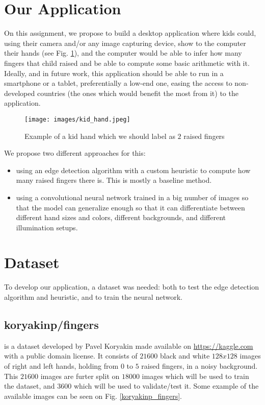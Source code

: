 \documentclass[conference]{IEEEtran}
\begin{document}
\section{Our Application}

On this assignment, we propose to build a desktop application where kids could, using their camera and/or any image capturing device, show to the computer their hands (see Fig. \ref{kid_hand}), and the computer would be able to infer how many fingers that child raised and be able to compute some basic arithmetic with it. Ideally, and in future work, this application should be able to run in a smartphone or a tablet, preferentially a low-end one, easing the access to non-developed countries (the ones which would benefit the most from it) to the application.

\begin{figure}[htbp]
\centerline{\texttt{[image: images/kid\_hand.jpeg]}}
\caption{Example of a kid hand which we should label as $2$ raised fingers}
\label{kid_hand}
\end{figure}

We propose two different approaches for this:

\begin{itemize}
    \item using an edge detection algorithm with a custom heuristic to compute how many raised fingers there is. This is mostly a baseline method.
    \item using a convolutional neural network trained in a big number of images so that the model can generalize enough so that it can differentiate between different hand sizes and colors, different backgrounds, and different illumination setups.
\end{itemize}


\section {Dataset}

To develop our application, a dataset was needed: both to test the edge detection algorithm and heuristic, and to train the neural network.

\subsection{koryakinp/fingers}
\cite{b7} is a dataset developed by Pavel Koryakin made available on \href{Kaggle}{https://kaggle.com}  with a public domain license. It consists of $21600$ black and white $128x128$ images of right and left hands, holding from $0$ to $5$ raised fingers, in a noisy background. This $21600$ images are  furter split on $18000$ images which will be used to train the dataset, and $3600$ which will be used to validate/test it. Some example of the available images can be seen on Fig. \ref{koryakinp_fingers}.
\end{document}
